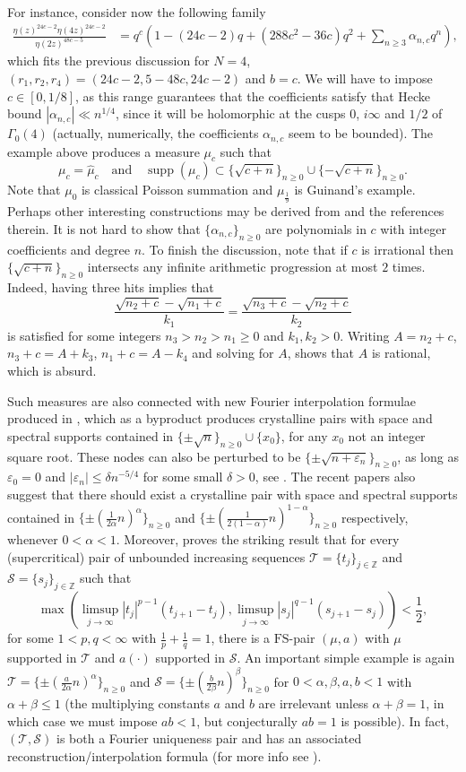 \documentclass[a4paper,reqno,12pt]{amsart}
\DeclareMathOperator{\supp}{\mathrm{supp}}
\renewcommand{\S}{\mathcal{S}}
\newcommand{\T}{\mathcal{T}}
\newcommand{\z}{\mathbb{Z}}
\newcommand{\ft}{\widehat}
\newcommand{\al}{\alpha}
\newcommand{\be}{\beta}
\newcommand{\ep}{\varepsilon}
\newcommand{\1}{{\bf 1}}
\newcommand{\fs}{\mathrm{FS}}
\renewcommand{\1}{{\bo 1}}
\renewcommand{\a}{a(\cdot)}
\begin{document}
For instance, consider now the following family
\begin{align*}
\frac{\eta(z)^{24c-2}\eta(4z)^{24c-2}}{\eta(2z)^{48c-5}} & = q^{c}\left(1-(24c - 2)q + (288c^2 - 36c)q^2 + \sum_{n\geq 3} \al_{n,c} q^n \right),
\end{align*}
which fits the previous discussion for $N=4$, $(r_1,r_2,r_4)=(24c-2,5-48c,24c-2)$  and $b=c$. We will have to impose $c\in [0,1/8]$,  as this range guarantees that the coefficients satisfy that Hecke bound $|\al_{n,c}| \ll n^{1/4}$, since it will be holomorphic at the cusps $0$, $i\infty$ and $1/2$ of $\Gamma_0(4)$ (actually, numerically, the coefficients  $\al_{n,c}$ seem to be bounded). The example above produces a measure $\mu_{c}$ such that
$$
\mu_{c}= \ft \mu_{c} \quad \text{and}\quad \supp(\mu_{c})\subset \{\sqrt{c+n}\}_{n\geq 0} \cup \{-\sqrt{c+n}\}_{n\geq 0}.
$$
Note that $\mu_{0}$  is classical Poisson summation and $\mu_{\tfrac19}$ is Guinand's example. Perhaps other interesting constructions may be derived from \cite{Lem} and the references therein. It is not hard to show that $\{ \al_{n,c}\}_{n\geq 0}$ are polynomials in $c$ with integer coefficients and degree $n$. To finish the discussion, note that if $c$ is irrational then $\{\sqrt{c+n}\}_{n\geq 0}$ intersects any infinite arithmetic progression at most $2$ times. Indeed, having three hits implies that
$$
\frac{\sqrt{n_2+c}-\sqrt{n_1+c}}{k_1} = \frac{\sqrt{n_3+c}-\sqrt{n_2+c}}{k_2}
$$ 
is satisfied for some integers $n_3>n_2>n_1\geq 0$ and $k_1,k_2>0$. Writing $A=n_2+c$, $n_3+c=A+k_3$, $n_1+c=A-k_4$ and solving for $A$, shows that $A$ is rational, which is absurd.


Such measures are also connected with new Fourier interpolation formulae produced in \cite{RV}, which as a byproduct produces crystalline pairs with space and spectral supports contained in $\{\pm \sqrt{n}\}_{n\geq 0}\cup \{x_0\}$, for any $x_0$ not an integer square root.  These nodes can also be perturbed to be $\{\pm \sqrt{n+\ep_n}\}_{n\geq 0}$, as long as $\ep_0=0$ and $|\ep_n|\leq \delta n^{-5/4}$ for some small $\delta>0$, see \cite{RS1}. The recent  papers \cite{RS,KNS} also suggest that there should exist a crystalline pair with space and spectral supports contained in $\{\pm(\tfrac1{2\al} n)^{\al}\}_{n\geq 0}$ and $\{\pm(\tfrac1{2(1-\al)} n)^{1-\al}\}_{n\geq 0}$ respectively, whenever $0<\al<1$. Moreover, \cite[Cor. 3]{KNS} proves the striking result that for every (supercritical) pair of unbounded increasing sequences $\T=\{t_j\}_{j\in \z}$ and $\S=\{s_j\}_{j\in \z}$ such that
$$
\max\left(\limsup_{j\to\infty} |t_j|^{p-1}(t_{j+1}-t_j),\limsup_{j\to\infty} |s_j|^{q-1}(s_{j+1}-s_j)\right) <\frac12,
$$
for some $1<p,q<\infty$ with $\frac{1}{p}+\frac{1}{q}=1$, there is a $\fs$-pair $(\mu,a)$ with $\mu$ supported in $\T$ and $\a$ supported in $\S$. An important simple example is again $\T=\{\pm (\tfrac{a}{2\al} n)^{\al}\}_{n \geq 0}$ and $\S=\{\pm (\tfrac{b}{2\be}n)^{\be}\}_{n\geq 0}$ for $0<\al,\be,a,b<1$ with $\al+\be\leq 1$ (the multiplying constants $a$ and $b$ are irrelevant unless $\al+\be=1$, in which case we must impose $ab<1$, but conjecturally $ab=1$ is possible). In fact, $(\T,\S)$ is both a Fourier uniqueness pair and has an associated reconstruction/interpolation formula (for more info see \cite{KNS}).
\end{document}
